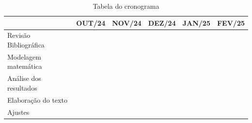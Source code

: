 \documentclass[
	12pt,				%
	openright,			%
	a4paper,			%
	english,			%
	french,				%
	spanish,			%
	brazil				%
	]{article}
\begin{document}
\begin{table}[H]
\begin{tabular}{llllll}
\hline
                        & OUT/24                                          & NOV/24                                          & DEZ/24                                          & JAN/25                                          & FEV/25                   \\ \hline
Revisão Bibliográfica & \cellcolor[HTML]{656565}{\color[HTML]{333333} } & \cellcolor[HTML]{656565}{\color[HTML]{333333} } & \cellcolor[HTML]{656565}{\color[HTML]{333333} } & \cellcolor[HTML]{656565}{\color[HTML]{333333} } & \cellcolor[HTML]{656565} \\ \hline
Modelagem matemática    &                                                 & \cellcolor[HTML]{656565}{\color[HTML]{333333} } & \cellcolor[HTML]{656565}                        &                                                 &                          \\ \hline
Análise dos resultados  &                                                 & \cellcolor[HTML]{656565}{\color[HTML]{333333} } & \cellcolor[HTML]{656565}{\color[HTML]{333333} } & \cellcolor[HTML]{656565}                        &                          \\ \hline
Elaboração do texto     &                                                 &                                                 & \cellcolor[HTML]{656565}{\color[HTML]{333333} } & \cellcolor[HTML]{656565}{\color[HTML]{333333} } & \cellcolor[HTML]{656565} \\ \hline
Ajustes                 &                                                 &                                                 &                                                 &                                                 & \cellcolor[HTML]{656565} \\ \hline
\end{tabular}
\caption{Tabela do cronograma}
\label{table:1}
\end{table}


\end{document}

